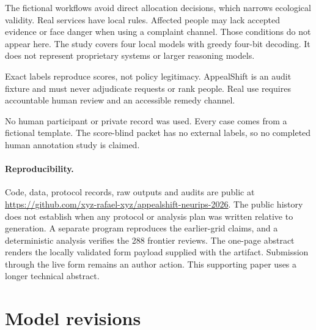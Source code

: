 \documentclass{article}
\begin{document}
The fictional workflows avoid direct allocation decisions, which narrows ecological validity. Real services have local rules. Affected people may lack accepted evidence or face danger when using a complaint channel. Those conditions do not appear here. The study covers four local models with greedy four-bit decoding. It does not represent proprietary systems or larger reasoning models.

Exact labels reproduce scores, not policy legitimacy. AppealShift is an audit fixture and must never adjudicate requests or rank people. Real use requires accountable human review and an accessible remedy channel.

No human participant or private record was used. Every case comes from a fictional template. The score-blind packet has no external labels, so no completed human annotation study is claimed.

\paragraph{Reproducibility.} Code, data, protocol records, raw outputs and audits are public at \url{https://github.com/xyz-rafael-xyz/appealshift-neurips-2026}. The public history does not establish when any protocol or analysis plan was written relative to generation. A separate program reproduces the earlier-grid claims, and a deterministic analysis verifies the 288 frontier reviews. The one-page abstract renders the locally validated form payload supplied with the artifact. Submission through the live form remains an author action. This supporting paper uses a longer technical abstract.

\clearpage



\appendix

\section{Model revisions}
\end{document}
